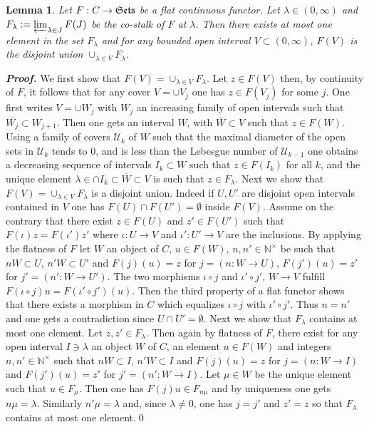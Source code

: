 \documentclass{elsart3-1}
\newtheorem{lemma}[theorem]{Lemma}
\def\N{{\mathbb N}}
\def\cU{{\mathcal U}}
\def\Se{\frak{ Sets}}
\def\nt{\N^{\times}}
\def\vsp{\vspace{.05in}}
\begin{document}
\begin{lemma}\label{case2} Let $F:C\to \Se$ be a flat continuous functor.
Let $\lambda\in(0,\infty)$ and $F_\lambda:=\varprojlim_{\lambda\in J} F(J)$ be the co-stalk of $F$ at $\lambda$. Then there exists at most one element in the set $F_\lambda$ and for any bounded open interval $V\subset (0,\infty)$, $F(V)$ is the disjoint union $\cup_{\lambda \in V} F_\lambda$.
\end{lemma}
{\it\bf Proof.} 
 We first show that $F(V)=\cup_{\lambda \in V} F_\lambda$. Let $z\in F(V)$ then, by continuity of $F$, it follows that for any  
cover $V=\cup V_j$ one has $z\in F(V_j)$ for some $j$. One first writes  $V=\cup W_j$ with $W_j$ an increasing family of open intervals such that $\overline{ W_j}\subset W_{j+1}$. Then one gets an interval $W$, with $\overline{W}\subset V$ such that $z\in F(W)$. Using a family of covers $\cU_k$ of $W$ such that the maximal diameter of the open sets in $\cU_k$ tends to $0$, and is less than the Lebesgue number of $\cU_{k-1}$ one obtains a decreasing sequence of intervals $I_k\subset W$ such that $z\in F(I_k)$ for all $k$, and the unique element $\lambda\in\cap I_k\subset \overline{W}\subset V$ is such that $z\in F_\lambda$. Next we show that $F(V)=\cup_{\lambda \in V} F_\lambda$ is a disjoint union. Indeed if $U,U'$ are disjoint open intervals contained in $V$ one has $F(U)\cap F(U')=\emptyset$ inside  $F(V)$. Assume on the contrary that there exist $z\in F(U)$ and $z'\in F(U')$ such that  $F(\iota)z=F(\iota')z'$ where $\iota:U\to V$ and $\iota':U'\to V$ are the inclusions. By applying the flatness of $F$ let $W$ an object of $C$, $u\in F(W)$, $n,n'\in \nt$ be such that $nW\subset U$, $n'W\subset U'$ and $F(j)(u)=z$ for $j=(n:W\to U)$, $F(j')(u)=z'$ for $j'=(n':W\to U')$. The two morphisms $\iota\circ j$ and $\iota'\circ j'$, $W\to V$ fulfill $F(\iota\circ j)u=F(\iota'\circ j')(u)$. Then the third property of a flat functor shows that there exists a morphism in $C$ which equalizes $\iota\circ j$ with $\iota'\circ j'$. Thus $n=n'$ and one gets a contradiction since $U\cap U'=\emptyset$. 
 Next we  show that $F_\lambda$ contains at most one element.
Let $z,z'\in F_\lambda$. Then again by flatness of  $F$, there exist for any open interval $I\ni\lambda$ an object $W$ of $C$, an element $u\in F(W)$ and integers $n,n'\in \nt$ such that $nW\subset I$, $n'W\subset I$ and $F(j)(u)=z$ for $j=(n:W\to I)$ and $F(j')(u)=z'$ for $j'=(n':W\to I)$. Let $\mu\in W$ be the unique element  such that $u\in F_\mu$. Then one has $F(j)u\in F_{n\mu}$ and  by uniqueness one gets $n\mu=\lambda$. Similarly $n'\mu=\lambda$ and, since $\lambda\neq 0$, one has $j=j'$ and $z'=z$ so that $F_\lambda$ contains at most one element.\qed
\vsp
\end{document}
